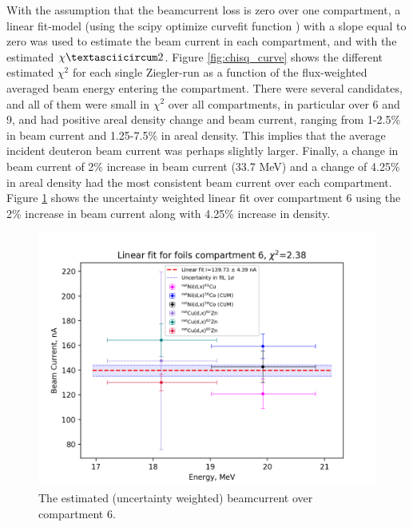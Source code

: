 With the assumption that the beamcurrent loss is zero over one compartment, a linear fit-model (using the scipy optimize curvefit function \cite{Virtanen2020}) with a slope equal to zero was used to estimate the beam current in each compartment, and with the estimated $\chiˆ2$. Figure \ref{fig:chisq_curve} shows the different estimated $\chi^2$ for each single Ziegler-run as a function of the flux-weighted averaged beam energy entering the compartment. There were several candidates, and all of them were small in $\chi^2$ over all compartments, in particular over 6 and 9, and had positive areal density change and beam current, ranging from 1-2.5\% in beam current and 1.25-7.5\% in areal density. This implies that the average incident deuteron beam current was perhaps slightly larger. Finally, a change in beam current of 2\% increase in beam current (33.7 MeV) and a change of 4.25\% in areal density had the most consistent beam current over each compartment. Figure \ref{fig:BC_comp6} shows the uncertainty weighted linear fit over compartment 6 using the 2\% increase in beam current along with 4.25\% increase in density.  \\



\begin{figure}
    \centering
    \includegraphics{Analysis/Compartment_6.png}
    \caption{The estimated (uncertainty weighted) beamcurrent over compartment 6.  }
    \label{fig:BC_comp6}
\end{figure}

